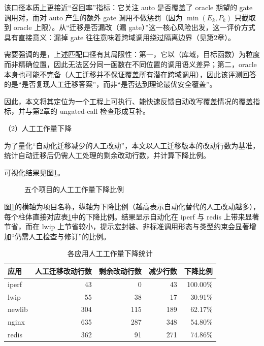 \documentclass[UTF8,a4paper,12pt,twoside]{ctexart}  %
\begin{document}
该口径本质上更接近``召回率''指标：它关注 auto 是否覆盖了 oracle 期望的
gate 调用对，而对 auto 产生的额外 gate 调用不做惩罚（因为
\(\min(E_k,P_k)\) 只截取到 oracle 上限）。从``迁移是否漏改（漏
gate）''这一核心风险出发，这一评价方式具有直接意义：漏掉 gate
往往意味着跨域调用绕过隔离边界（见第2章）。

需要强调的是，上述匹配口径有其局限性：第一，它以（库域，目标函数）为粒度而非精确位置，因此无法区分同一函数在不同位置的调用语义差异；第二，oracle
本身也可能不完备（人工迁移并不保证覆盖所有潜在跨域调用），因此该评测回答的是``是否复现人工迁移答案''，而非``是否达到理论最优安全覆盖''。

因此，本文将其定位为一个工程上可执行、能快速反馈自动改写覆盖情况的覆盖指标，并与第2章的
ungated-call 检查形成互补。

（2）人工工作量下降

为了量化``自动化迁移减少的人工改动''，本文以人工迁移版本的改动行数为基准，统计自动迁移后仍需人工处理的剩余改动行数，并计算下降比例。

可视化结果见图\ref{fig:auto-manual-effort-reduction}。
\begin{figure}[h]
  \centering
  
  \caption{五个项目的人工工作量下降比例}
  \label{fig:auto-manual-effort-reduction}
\end{figure}

图\ref{fig:auto-manual-effort-reduction}的横轴为项目名称，纵轴为下降比例（越高表示自动化替代的人工改动越多），每个柱体直接对应表\ref{tab:manual-effort-reduction-by-app}中的下降比例。结果显示自动化在 iperf 与 redis 上带来显著节省，而在 lwip 上节省较小，提示宏封装、非标准调用形态与类型约束会显著增加``仍需人工检查与修订''的比例。


{\small
\setlength{\tabcolsep}{4pt}
\begin{longtable}{@{}lrrrr@{}}
  \caption{各应用人工工作量下降统计}\label{tab:manual-effort-reduction-by-app} \\
  \toprule
  应用     & 人工迁移改动行数 & 剩余改动行数 & 减少行数 & 下降比例                         \\
  \midrule
  \endhead
  \bottomrule
  \endlastfoot
  iperf  & 43       & 0      & 43   & 100.00\%                     \\
  lwip   & 55       & 38     & 17   & 30.91\%                      \\
  newlib & 304      & 115    & 189  & 62.17\%                      \\
  nginx  & 635      & 287    & 348  & 54.80\%                      \\
  redis  & 362      & 91     & 271  & 74.86\%                      \\
\end{longtable}
}
\end{document}
